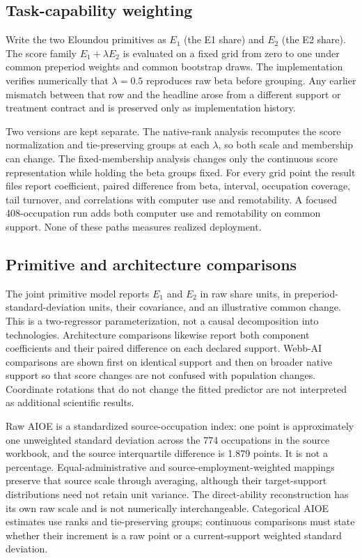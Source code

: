 

\subsection{Task-capability weighting}

Write the two Eloundou primitives as $E_1$ (the E1 share) and $E_2$ (the E2 share).  The score family $E_1+\lambda E_2$ is evaluated on a fixed grid from zero to one under common preperiod weights and common bootstrap draws.  The implementation verifies numerically that $\lambda=0.5$ reproduces raw beta before grouping.  Any earlier mismatch between that row and the headline arose from a different support or treatment contract and is preserved only as implementation history.

Two versions are kept separate.  The native-rank analysis recomputes the score normalization and tie-preserving groups at each $\lambda$, so both scale and membership can change.  The fixed-membership analysis changes only the continuous score representation while holding the beta groups fixed.  For every grid point the result files report coefficient, paired difference from beta, interval, occupation coverage, tail turnover, and correlations with computer use and remotability.  A focused 408-occupation run adds both computer use and remotability on common support.  None of these paths measures realized deployment.

\subsection{Primitive and architecture comparisons}

The joint primitive model reports $E_1$ and $E_2$ in raw share units, in preperiod-standard-deviation units, their covariance, and an illustrative common change.  This is a two-regressor parameterization, not a causal decomposition into technologies.  Architecture comparisons likewise report both component coefficients and their paired difference on each declared support.  Webb-AI comparisons are shown first on identical support and then on broader native support so that score changes are not confused with population changes.  Coordinate rotations that do not change the fitted predictor are not interpreted as additional scientific results.

Raw AIOE is a standardized source-occupation index: one point is approximately one unweighted standard deviation across the 774 occupations in the source workbook, and the source interquartile difference is 1.879 points.  It is not a percentage.  Equal-administrative and source-employment-weighted mappings preserve that source scale through averaging, although their target-support distributions need not retain unit variance.  The direct-ability reconstruction has its own raw scale and is not numerically interchangeable.  Categorical AIOE estimates use ranks and tie-preserving groups; continuous comparisons must state whether their increment is a raw point or a current-support weighted standard deviation.

